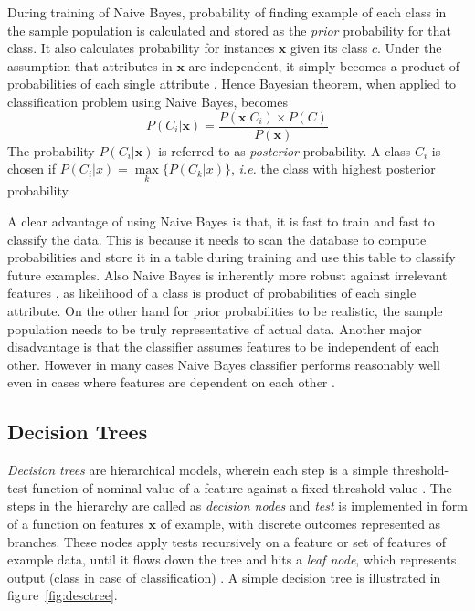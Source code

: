 During training of Naive Bayes, probability of finding example of each class in the sample population is calculated and stored as the \emph{prior} probability for that class. It also calculates probability for instances $\boldsymbol{x}$ given its class $c$. Under the assumption that attributes in $\boldsymbol{x}$ are independent, it simply becomes a product of probabilities of each single attribute \cite{Williams2006}.
Hence Bayesian theorem, when applied to classification problem using Naive Bayes, becomes
\[ P(C_i|\boldsymbol{x}) = \frac{P(\boldsymbol{x}|C_i) \times P(C)}{P(\boldsymbol{x})}\]
The probability $P(C_i|\boldsymbol{x})$ is referred to as \emph{posterior} probability. A class $C_i$ is chosen if $P(C_i|x) = \max\limits_{k} \{ P(C_k|x)\}$, \emph{i.e.} the class with highest posterior probability.

A clear advantage of using Naive Bayes is that, it is fast to train and fast to classify the data. This is because it needs to scan the database to compute probabilities and store it in a table during training and use this table to classify future examples. Also Naive Bayes is inherently more robust against irrelevant features \cite{Kim2008}, as likelihood of a class is product of probabilities of each single attribute. On the other hand for prior probabilities to be realistic, the sample population needs to be truly representative of actual data. Another major disadvantage is that the classifier assumes features to be independent of each other. However in many cases Naive Bayes classifier performs reasonably well even in cases where features are dependent on each other \cite{John1995, Williams2006}.

\subsection{Decision Trees}
\emph{Decision trees} are hierarchical models, wherein each step is a simple threshold-test function of nominal value of a feature against a fixed threshold value \cite{Kotsiantis2013}. The steps in the hierarchy are called as \emph{decision nodes} and \emph{test} is implemented in form of a function on features $\boldsymbol{x}$ of example, with discrete outcomes represented as branches. These nodes apply tests recursively on a feature or set of features of example data, until it flows down the tree and hits a \emph{leaf node}, which represents output (class in case of classification) \cite{Alpaydin2004}. A simple decision tree is illustrated in figure~\ref{fig:desctree}.

